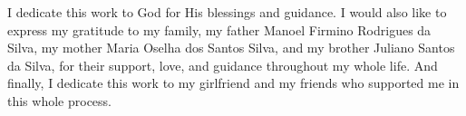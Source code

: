 I dedicate this work to God for His blessings and guidance. I would also like to express my
gratitude to my family, my father Manoel Firmino Rodrigues da Silva, my mother Maria
Oselha dos Santos Silva, and my brother Juliano Santos da Silva, for their support, love,
and guidance throughout my whole life. And finally, I dedicate this work to my girlfriend
and my friends who supported me in this whole process.
